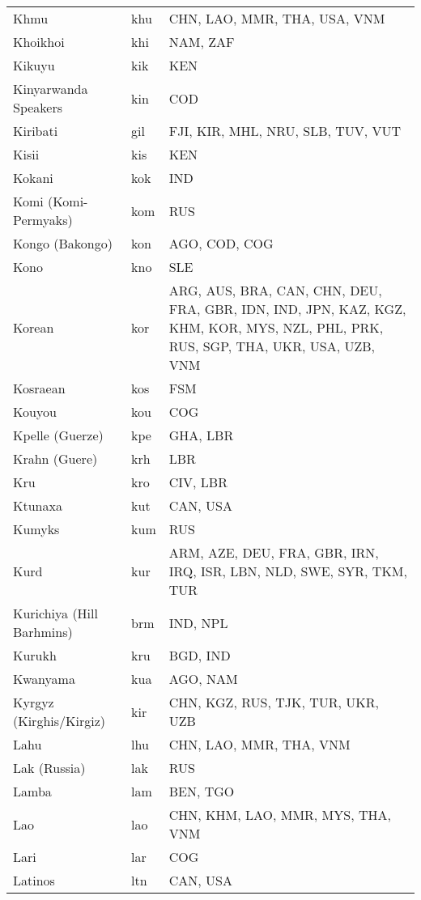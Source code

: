 \documentclass[12pt]{article}
\begin{document}
\begin{center}
\begin{longtable}{|p{7cm}|p{1cm}|p{7cm}|}
Khmu	&	khu	&	CHN, LAO, MMR, THA, USA, VNM	\\	\cline{1-3}
Khoikhoi	&	khi 	&	NAM, ZAF	\\	\cline{1-3}
Kikuyu 	&	kik 	&	KEN	\\	\cline{1-3}
Kinyarwanda Speakers	&	kin	&	COD	\\	\cline{1-3}
Kiribati	&	gil 	&	FJI, KIR, MHL, NRU, SLB, TUV, VUT	\\	\cline{1-3}
Kisii	&	kis	&	KEN	\\	\cline{1-3}
Kokani	&	kok 	&	IND	\\	\cline{1-3}
Komi (Komi-Permyaks)	&	kom 	&	RUS	\\	\cline{1-3}
Kongo (Bakongo)	&	kon 	&	AGO, COD, COG	\\	\cline{1-3}
Kono	&	kno	&	SLE	\\	\cline{1-3}
Korean	&	kor 	&	ARG, AUS, BRA, CAN, CHN, DEU, FRA, GBR, IDN, IND, JPN, KAZ, KGZ, KHM, KOR, MYS, NZL, PHL, PRK, RUS, SGP, THA, UKR, USA, UZB, VNM	\\	\cline{1-3}
Kosraean	&	kos 	&	FSM	\\	\cline{1-3}
Kouyou	&	kou	&	COG	\\	\cline{1-3}
Kpelle (Guerze)	&	kpe 	&	GHA, LBR	\\	\cline{1-3}
Krahn (Guere)	&	krh	&	LBR	\\	\cline{1-3}
Kru	&	kro 	&	CIV, LBR	\\	\cline{1-3}
Ktunaxa	&	kut 	&	CAN, USA	\\	\cline{1-3}
Kumyks	&	kum 	&	RUS	\\	\cline{1-3}
Kurd	&	kur 	&	ARM, AZE, DEU, FRA, GBR, IRN, IRQ,  ISR, LBN, NLD, SWE, SYR, TKM, TUR	\\	\cline{1-3}
Kurichiya (Hill Barhmins)	&	brm	&	IND, NPL	\\	\cline{1-3}
Kurukh	&	kru 	&	BGD, IND	\\	\cline{1-3}
Kwanyama	&	kua 	&	AGO, NAM	\\	\cline{1-3}
Kyrgyz (Kirghis/Kirgiz)	&	kir 	&	CHN, KGZ, RUS, TJK, TUR, UKR, UZB	\\	\cline{1-3}
Lahu	&	lhu	&	CHN, LAO, MMR, THA, VNM	\\	\cline{1-3}
Lak (Russia)	&	lak	&	RUS	\\	\cline{1-3}
Lamba	&	lam 	&	BEN, TGO	\\	\cline{1-3}
Lao	&	lao 	&	CHN, KHM, LAO, MMR, MYS, THA, VNM	\\	\cline{1-3}
Lari	&	lar	&	COG	\\	\cline{1-3}
Latinos	&	ltn	&	CAN, USA	\\	\cline{1-3}

\end{longtable}
\end{center}
\end{document}
